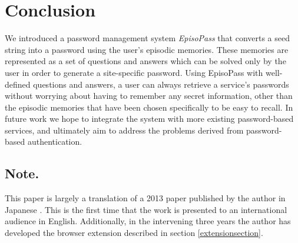 \documentclass[runningheads,a4paper]{llncs}
\begin{document}
\section{Conclusion}

We introduced a password management system {\it EpisoPass\/}
that converts a seed string into a password using the user's
episodic memories. These memories are represented as a set of questions and answers
which can be solved only by the user in order to generate a site-specific password.
%
Using EpisoPass with well-defined questions and answers,
a user can always retrieve a service's passwords without worrying about
having to remember any secret information, other than the episodic memories
that have been chosen specifically to be easy to recall.
%
In future work we hope to integrate the system with more existing password-based
services, and ultimately aim to address the problems
derived from password-based authentication.

%
%

\subsection*{Note.}

This paper is largely a translation of a 2013 paper published by the
author in Japanese \cite{WISS2013}. This is the first time that the
work is presented to an international audience in English.
Additionally, in the intervening three years the author has
developed the browser extension described in section \ref{extensionsection}.







\end{document}

